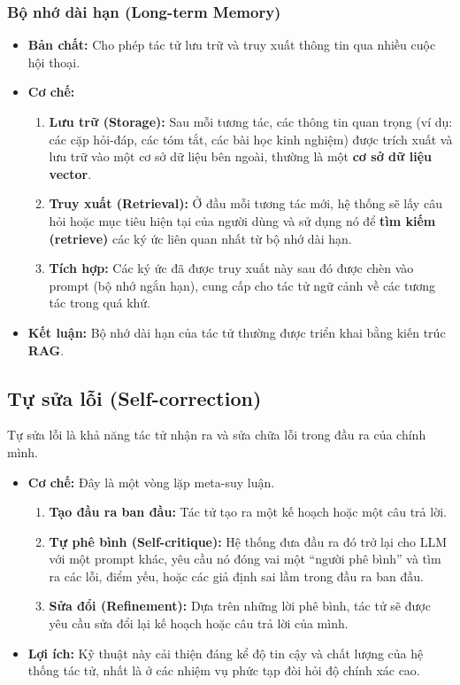 \subsubsection{Bộ nhớ dài hạn (Long-term Memory)}
\begin{itemize}
    \item \textbf{Bản chất:} Cho phép tác tử lưu trữ và truy xuất thông tin qua nhiều cuộc hội thoại.
    \item \textbf{Cơ chế:}
        \begin{enumerate}
            \item \textbf{Lưu trữ (Storage):} Sau mỗi tương tác, các thông tin quan trọng (ví dụ: các cặp hỏi-đáp, các tóm tắt, các bài học kinh nghiệm) được trích xuất và lưu trữ vào một cơ sở dữ liệu bên ngoài, thường là một \textbf{cơ sở dữ liệu vector}.
            \item \textbf{Truy xuất (Retrieval):} Ở đầu mỗi tương tác mới, hệ thống sẽ lấy câu hỏi hoặc mục tiêu hiện tại của người dùng và sử dụng nó để \textbf{tìm kiếm (retrieve)} các ký ức liên quan nhất từ bộ nhớ dài hạn.
            \item \textbf{Tích hợp:} Các ký ức đã được truy xuất này sau đó được chèn vào prompt (bộ nhớ ngắn hạn), cung cấp cho tác tử ngữ cảnh về các tương tác trong quá khứ.
        \end{enumerate}
    \item \textbf{Kết luận:} Bộ nhớ dài hạn của tác tử thường được triển khai bằng kiến trúc \textbf{RAG}.
\end{itemize}

\subsection{Tự sửa lỗi (Self-correction)}
\label{ssec:self_correction}
Tự sửa lỗi là khả năng tác tử nhận ra và sửa chữa lỗi trong đầu ra của chính mình.
\begin{itemize}
    \item \textbf{Cơ chế:} Đây là một vòng lặp meta-suy luận.
        \begin{enumerate}
            \item \textbf{Tạo đầu ra ban đầu:} Tác tử tạo ra một kế hoạch hoặc một câu trả lời.
            \item \textbf{Tự phê bình (Self-critique):} Hệ thống đưa đầu ra đó trở lại cho LLM với một prompt khác, yêu cầu nó đóng vai một “người phê bình” và tìm ra các lỗi, điểm yếu, hoặc các giả định sai lầm trong đầu ra ban đầu.
            \item \textbf{Sửa đổi (Refinement):} Dựa trên những lời phê bình, tác tử sẽ được yêu cầu sửa đổi lại kế hoạch hoặc câu trả lời của mình.
        \end{enumerate}
    \item \textbf{Lợi ích:} Kỹ thuật này cải thiện đáng kể độ tin cậy và chất lượng của hệ thống tác tử, nhất là ở các nhiệm vụ phức tạp đòi hỏi độ chính xác cao.
\end{itemize}

